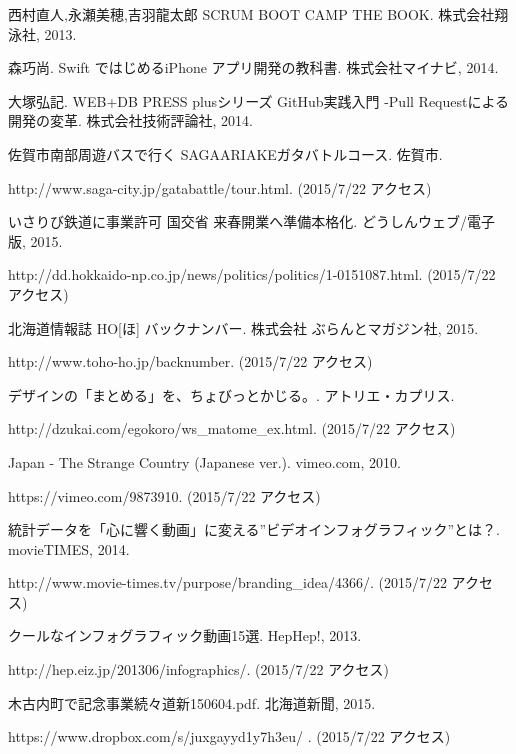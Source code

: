 \documentclass[openany,11pt,papersize]{jsbook}
\begin{document}
\begin{thebibliography}{9}
\newblock 西村直人,永瀬美穂,吉羽龍太郎
\newblock SCRUM BOOT CAMP THE BOOK.
\newblock 株式会社翔泳社, 2013.

\newblock 森巧尚.
\newblock Swift ではじめるiPhone アプリ開発の教科書.
\newblock 株式会社マイナビ, 2014.

\newblock 大塚弘記.
\newblock WEB+DB PRESS plusシリーズ GitHub実践入門 -Pull Requestによる開発の変革.
\newblock 株式会社技術評論社, 2014.

佐賀市南部周遊バスで行く SAGAARIAKEガタバトルコース. 佐賀市. \par
http://www.saga-city.jp/gatabattle/tour.html. (2015/7/22 アクセス)

いさりび鉄道に事業許可 国交省 来春開業へ準備本格化. どうしんウェブ/電子版, 2015.\par
http://dd.hokkaido-np.co.jp/news/politics/politics/1-0151087.html. (2015/7/22 アクセス)

北海道情報誌 HO[ほ] バックナンバー. 株式会社 ぶらんとマガジン社, 2015.\par 
http://www.toho-ho.jp/backnumber. (2015/7/22 アクセス)

デザインの「まとめる」を、ちょびっとかじる。.  	アトリエ・カプリス. \par
http://dzukai.com/egokoro/ws\_matome\_ex.html. (2015/7/22 アクセス)

Japan - The Strange Country (Japanese ver.). vimeo.com, 2010.\par
https://vimeo.com/9873910. (2015/7/22 アクセス)

統計データを「心に響く動画」に変える”ビデオインフォグラフィック”とは？. movieTIMES, 2014.\par
http://www.movie-times.tv/purpose/branding\_idea/4366/. (2015/7/22 アクセス)

クールなインフォグラフィック動画15選. HepHep!, 2013.\par
http://hep.eiz.jp/201306/infographics/. (2015/7/22 アクセス)

木古内町で記念事業続々道新150604.pdf. 北海道新聞, 2015.\par
https://www.dropbox.com/s/juxgayyd1y7h3eu/%
. 
(2015/7/22 アクセス)


\end{thebibliography}
\end{document}
